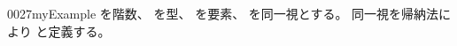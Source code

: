 \documentclass[index]{subfiles}
\begin{document}
\begin{myBlock}{0027}{myExample}
  を階数、
  を型、
  を要素、
  を同一視とする。
  同一視を帰納法により
  と定義する。
\end{myBlock}
\end{document}
